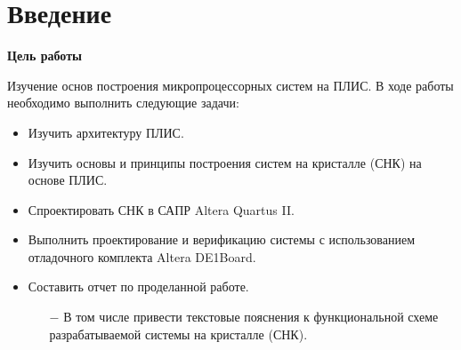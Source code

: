 \tableofcontents
\clearpage

\chapter{Введение}


\textbf{Цель работы}\newline

Изучение основ построения микропроцессорных систем на ПЛИС.
В ходе работы необходимо выполнить следующие задачи:

\begin{itemize}
    \item Изучить архитектуру ПЛИС.
    \item Изучить основы и принципы построения систем на кристалле (СНК) на основе ПЛИС.
    \item Спроектировать СНК в САПР Altera Quartus II.
    \item Выполнить проектирование и верификацию системы с использованием отладочного комплекта Altera DE1Board.
    \item Составить отчет по проделанной работе. \begin{itemize}
         \item[$-$] В том числе привести текстовые пояснения к функциональной схеме разрабатываемой системы на кристалле (СНК).
    \end{itemize}
\end{itemize}
